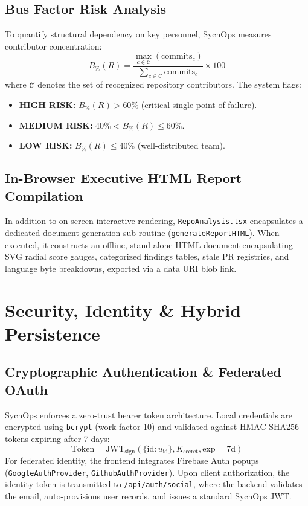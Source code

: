 \documentclass[conference]{IEEEtran}
\begin{document}
\subsection{Bus Factor Risk Analysis}
To quantify structural dependency on key personnel, SycnOps measures contributor concentration:
\begin{equation}
B_{\%}(R) = \frac{\max_{c \in \mathcal{C}} (\text{commits}_c)}{\sum_{c \in \mathcal{C}} \text{commits}_c} \times 100
\end{equation}
where $\mathcal{C}$ denotes the set of recognized repository contributors. The system flags:
\begin{itemize}
    \item \textbf{HIGH RISK:} $B_{\%}(R) > 60\%$ (critical single point of failure).
    \item \textbf{MEDIUM RISK:} $40\% < B_{\%}(R) \le 60\%$.
    \item \textbf{LOW RISK:} $B_{\%}(R) \le 40\%$ (well-distributed team).
\end{itemize}

\subsection{In-Browser Executive HTML Report Compilation}
In addition to on-screen interactive rendering, \texttt{RepoAnalysis.tsx} encapsulates a dedicated document generation sub-routine (\texttt{generateReportHTML}). When executed, it constructs an offline, stand-alone HTML document encapsulating SVG radial score gauges, categorized findings tables, stale PR registries, and language byte breakdowns, exported via a data URI blob link.

\section{Security, Identity \& Hybrid Persistence}

\subsection{Cryptographic Authentication \& Federated OAuth}
SycnOps enforces a zero-trust bearer token architecture. Local credentials are encrypted using \texttt{bcrypt} (work factor 10) and validated against HMAC-SHA256 tokens expiring after 7 days:
\begin{equation}
\text{Token} = \text{JWT}_{\text{sign}}\left(\{ \text{id}: u_{\text{id}} \}, K_{\text{secret}}, \text{exp}=7\text{d}\right)
\end{equation}
For federated identity, the frontend integrates Firebase Auth popups (\texttt{GoogleAuthProvider}, \texttt{GithubAuthProvider}). Upon client authorization, the identity token is transmitted to \texttt{/api/auth/social}, where the backend validates the email, auto-provisions user records, and issues a standard SycnOps JWT.
\end{document}

